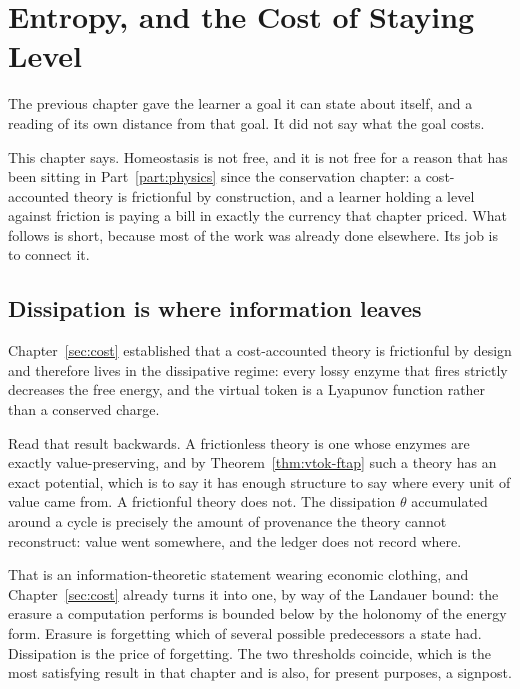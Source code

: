 \chapter{Entropy, and the Cost of Staying Level}
\label{ch:homeo-ent}

The previous chapter gave the learner a goal it can state about itself,
and a reading of its own distance from that goal.
It did not say what the goal costs.

This chapter says.
Homeostasis is not free, and it is not free for a reason that has been
sitting in Part~\ref{part:physics} since the conservation chapter: a
cost-accounted theory is frictionful by construction, and a learner
holding a level against friction is paying a bill in exactly the currency
that chapter priced.
What follows is short, because most of the work was already done
elsewhere.
Its job is to connect it.

\section{Dissipation is where information leaves}

Chapter~\ref{sec:cost} established that a cost-accounted theory is
frictionful by design and therefore lives in the dissipative regime:
every lossy enzyme that fires strictly decreases the free energy, and the
virtual token is a Lyapunov function rather than a conserved charge.

Read that result backwards.
A frictionless theory is one whose enzymes are exactly value-preserving,
and by Theorem~\ref{thm:vtok-ftap} such a theory has an exact potential,
which is to say it has enough structure to say where every unit of value
came from.
A frictionful theory does not.
The dissipation $\theta$ accumulated around a cycle is precisely the
amount of provenance the theory cannot reconstruct: value went somewhere,
and the ledger does not record where.

That is an information-theoretic statement wearing economic clothing, and
Chapter~\ref{sec:cost} already turns it into one, by way of the Landauer
bound: the erasure a computation performs is bounded below by the
holonomy of the energy form.
Erasure is forgetting which of several possible predecessors a state
had.
Dissipation is the price of forgetting.
The two thresholds coincide, which is the most satisfying result in that
chapter and is also, for present purposes, a signpost.

